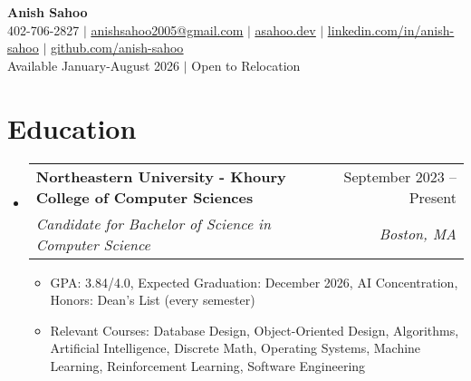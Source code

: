 \documentclass[letterpaper,11pt]{article}
\makeatletter
\newcommand{\resumeItem}[1]{
  \item\small{
    {#1 \vspace{-2pt}}
  }
}
\newcommand{\resumeSubheading}[4]{
  \vspace{-2pt}\item
    \begin{tabular*}{0.97\textwidth}[t]{l@{\extracolsep{\fill}}r}
      \textbf{#1} & #2 \\
      \textit{\small#3} & \textit{\small #4} \\
    \end{tabular*}\vspace{-7pt}
}
\newcommand{\resumeSubHeadingListStart}{\begin{itemize}[leftmargin=0.15in, label={}]}
\newcommand{\resumeSubHeadingListEnd}{\end{itemize}}
\newcommand{\resumeItemListStart}{\begin{itemize}}
\newcommand{\resumeItemListEnd}{\end{itemize}\vspace{-5pt}}
\makeatother
\begin{document}

\begin{center}
    \textbf{\Huge Anish Sahoo} \\ \vspace{1pt}
    \small 402-706-2827 
    $|$ 
    \href{mailto:anishsahoo2005@gmail.com}{\underline{anishsahoo2005@gmail.com}} $|$ 
    \href{https://asahoo.dev}{\underline{asahoo.dev}}
    $|$
    \href{https://linkedin.com/in/anish-sahoo}{\underline{linkedin.com/in/anish-sahoo}} $|$
    \href{https://github.com/anish-sahoo}{\underline{github.com/anish-sahoo}} \vspace{1pt} \\
    Available January-August 2026 $|$ Open to Relocation%
\end{center}


\section{Education}
  \resumeSubHeadingListStart
    \resumeSubheading
      {Northeastern University - Khoury College of Computer Sciences}{September 2023 -- Present}
      {Candidate for Bachelor of Science in Computer Science}{Boston, MA}
    \resumeItemListStart
        \resumeItem{GPA: 3.84/4.0, Expected Graduation: December 2026, AI Concentration, Honors: Dean's List (every semester)}
        \resumeItem{Relevant Courses: Database Design, Object-Oriented Design, Algorithms, Artificial Intelligence, Discrete Math, Operating Systems, Machine Learning, Reinforcement Learning, Software Engineering}
    \resumeItemListEnd
  \resumeSubHeadingListEnd
\end{document}
